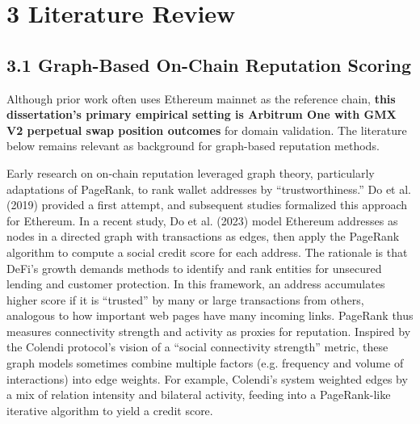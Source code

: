 \clearpage
{}
\section*{3 \textbf{Literature Review}}
\label{sec:literature-review}

\subsection*{3.1 Graph-Based On-Chain Reputation Scoring}
\label{sec:graph-based-on-chain-reputation-scoring}

Although prior work often uses Ethereum mainnet as the reference chain, \textbf{this dissertation's primary empirical setting is Arbitrum One with GMX V2 perpetual swap position outcomes} for domain validation. The literature below remains relevant as background for graph-based reputation methods.

Early research on on-chain reputation leveraged graph theory, particularly adaptations of PageRank, to rank wallet addresses by ``trustworthiness.'' Do et al. (2019) provided a first attempt, and subsequent studies formalized this approach for Ethereum. In a recent study, Do et al. (2023) model Ethereum addresses as nodes in a directed graph with transactions as edges, then apply the PageRank algorithm to compute a social credit score for each address. The rationale is that DeFi's growth demands methods to identify and rank entities for unsecured lending and customer protection. In this framework, an address accumulates higher score if it is ``trusted'' by many or large transactions from others, analogous to how important web pages have many incoming links. PageRank thus measures connectivity strength and activity as proxies for reputation. Inspired by the Colendi protocol's vision of a ``social connectivity strength'' metric, these graph models sometimes combine multiple factors (e.g. frequency and volume of interactions) into edge weights. For example, Colendi's system weighted edges by a mix of relation intensity and bilateral activity, feeding into a PageRank-like iterative algorithm to yield a credit score.


